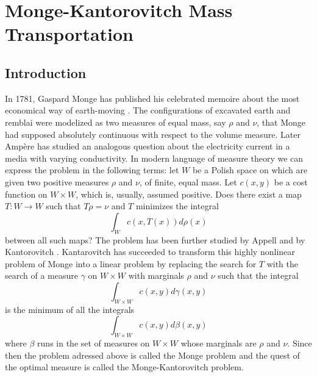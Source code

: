 \documentclass[12pt,a4paper]{book}
\newcommand{\ga}{\gamma}
\begin{document}
\chapter{Monge-Kantorovitch Mass  Transportation}
\section{Introduction}
\label{intro}

In 1781, Gaspard Monge has published his celebrated memoire about the
most economical way of earth-moving \cite{Monge}. The configurations
of excavated earth and remblai were  modelized as two measures of
equal mass, say $\rho$ and $\nu$, that Monge had supposed absolutely
continuous with respect to the volume measure. Later Amp\`ere has
studied an analogous question about the electricity current in a media
with varying conductivity. In modern language of measure theory we can
express the problem in the following terms: let $W$ be a Polish space
on which are given two positive measures $\rho$ and $\nu$,  of finite,
equal mass. Let $c(x,y)$ be a cost function on $W\times W$, which is,
usually, assumed  positive. Does there  exist a map $T:W\to W$ such that
$T\rho=\nu$ and $T$ minimizes the integral 
$$
\int_W c(x,T(x))d\rho(x)
$$
between all such maps? The problem has been further studied by Appell
 \cite{App-1,App-2} and by Kantorovitch \cite{Kan}. Kantarovitch has
 succeeded to transform this highly nonlinear problem of Monge into a
 linear problem by replacing the search for $T$ with the search of a
 measure $\ga$ on $W\times W$ with marginals $\rho$ and $\nu$  such that the
 integral 
$$
\int_{W\times W}c(x,y)d\ga(x,y)
$$
is the minimum  of all the integrals 
$$
\int_{W\times W}c(x,y)d\beta(x,y)
$$
where $\beta$ runs in the set of measures on $W\times W$ whose
marginals are $\rho$ and $\nu$. Since then the problem adressed above
is called the  Monge problem and the quest of the optimal
measure is called the  Monge-Kantorovitch problem. 
\end{document}
